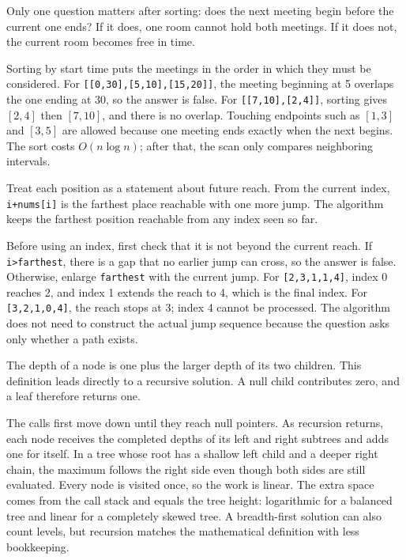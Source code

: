\expandafter\def\csname sourcewalkthrough@32\endcsname{%
Only one question matters after sorting: does the next meeting begin before
the current one ends? If it does, one room cannot hold both meetings. If it
does not, the current room becomes free in time.

Sorting by start time puts the meetings in the order in which they must be
considered. For \texttt{[[0,30],[5,10],[15,20]]}, the meeting beginning at 5
overlaps the one ending at 30, so the answer is false. For
\texttt{[[7,10],[2,4]]}, sorting gives \([2,4]\) then \([7,10]\), and there
is no overlap. Touching endpoints such as \([1,3]\) and \([3,5]\) are
allowed because one meeting ends exactly when the next begins. The sort costs
\(O(n\log n)\); after that, the scan only compares neighboring intervals.}

\expandafter\def\csname sourcewalkthrough@33\endcsname{%
Treat each position as a statement about future reach. From the
current index, \texttt{i+nums[i]} is the farthest place reachable with one
more jump. The algorithm keeps the farthest position reachable from any index
seen so far.

Before using an index, first check that it is not beyond the current reach. If
\texttt{i>farthest}, there is a gap that no earlier jump can cross, so the
answer is false. Otherwise, enlarge \texttt{farthest} with the current jump.
For \texttt{[2,3,1,1,4]}, index 0 reaches 2, and index 1 extends the reach to
4, which is the final index. For \texttt{[3,2,1,0,4]}, the reach stops at 3;
index 4 cannot be processed. The algorithm does not need to construct the
actual jump sequence because the question asks only whether a path exists.}

\expandafter\def\csname sourcewalkthrough@34\endcsname{%
The depth of a node is one plus the larger depth of its two children. This
definition leads directly to a recursive solution. A null child contributes
zero, and a leaf therefore returns one.

The calls first move down until they reach null pointers. As recursion returns,
each node receives the completed depths of its left and right subtrees and
adds one for itself. In a tree whose root has a shallow left child and a
deeper right chain, the maximum follows the right side even though both sides
are still evaluated. Every node is visited once, so the work is linear. The
extra space comes from the call stack and equals the tree height: logarithmic
for a balanced tree and linear for a completely skewed tree. A breadth-first
solution can also count levels, but recursion matches the mathematical
definition with less bookkeeping.}

